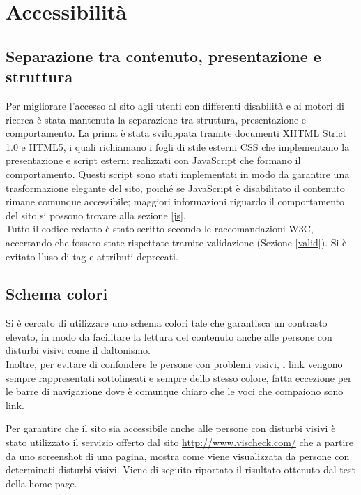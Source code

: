 \section{Accessibilità}

\subsection{Separazione tra contenuto, presentazione e struttura}
Per migliorare l'accesso al sito agli utenti con differenti disabilità e ai motori di ricerca è stata mantenuta la separazione tra struttura, presentazione e comportamento. 
La prima è stata sviluppata tramite documenti XHTML Strict 1.0 e HTML5, i quali richiamano i fogli di stile esterni CSS che implementano la presentazione e script esterni realizzati con JavaScript che formano il comportamento. Questi script sono stati implementati in modo da garantire una trasformazione elegante del sito, poiché se JavaScript è disabilitato il contenuto rimane comunque accessibile; maggiori informazioni riguardo il comportamento del sito si possono trovare alla sezione \ref{js}.\\ 
Tutto il codice redatto è stato scritto secondo le raccomandazioni W3C, accertando che fossero state rispettate tramite validazione (Sezione \ref{valid}). Si è evitato l'uso di tag e attributi deprecati.\\

\subsection{Schema colori}
Si è cercato di utilizzare uno schema colori tale che garantisca un contrasto elevato, in modo da facilitare la lettura del contenuto anche alle persone con disturbi visivi come il daltonismo.\\
Inoltre, per evitare di confondere le persone con problemi visivi, i link vengono sempre rappresentati sottolineati e sempre dello stesso colore, fatta eccezione per le barre di navigazione dove è comunque chiaro che le voci che compaiono sono link.

Per garantire che il sito sia accessibile anche alle persone con disturbi visivi è stato utilizzato il servizio offerto dal sito  \url{http://www.vischeck.com/} che a partire da uno screenshot di una pagina, mostra come viene visualizzata da persone con determinati disturbi visivi. Viene di seguito riportato il risultato ottenuto dal test della home page.


